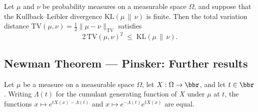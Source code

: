 \begin{theorem}
\label{CommunicationComplexity.two_mul_tvDistance_sq_le_toReal_klDiv}
\leanok
{}
Let $\mu$ and $\nu$ be probability measures on a measurable space $\Omega$, and suppose
that the Kullback–Leibler divergence $\mathrm{KL}(\mu \,\|\, \nu)$ is finite. Then the
total variation distance $\mathrm{TV}(\mu,\nu) = \tfrac{1}{2}\|\mu -
\nu\|_{\mathrm{TV}}$ satisfies
\[
  2\,\mathrm{TV}(\mu,\nu)^2 \;\le\; \mathrm{KL}(\mu \,\|\, \nu).
\]
\end{theorem}

\subsection*{Newman Theorem --- Pinsker: Further results}

\begin{theorem}
\label{CommunicationComplexity.exp_sub_cgf_eq}
\leanok
{}
Let $\mu$ be a measure on a measurable space $\Omega$, let $X:\Omega\to\bbr$, and let
$t\in\bbr$. Writing $\Lambda(t)$ for the cumulant generating function of $X$ under $\mu$
at $t$, the functions $x\mapsto e^{tX(x)-\Lambda(t)}$ and $x\mapsto
e^{-\Lambda(t)}e^{tX(x)}$ are equal.
\end{theorem}
